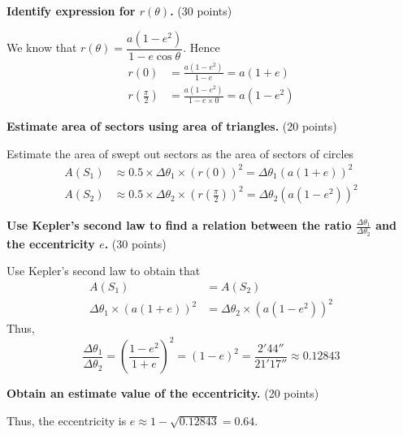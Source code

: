 \textbf{Identify expression for $r(\theta)$.} \hfill(30 points)

We know that
$r(\theta) = \dfrac{a\left(1 - e^2\right)}{1 - e\cos\theta}$. Hence %
\begin{align*}
  r(0) &= \frac{a\left(1 - e^2\right)}{1 - e} = a(1 + e) \\
  r\left(\frac{\pi}{2}\right)
    &= \frac{a\left(1 - e^2\right)}{1 - e\times0} = a\left(1 - e^2\right)
\end{align*}


\medskip
\textbf{Estimate area of sectors using area of triangles.} \hfill(20 points)

Estimate the area of swept out sectors as the area of sectors of circles
\begin{align*}
  A(S_1) &\approx 0.5\times\Delta\theta_1\times\left(r(0)\right)^2
    = \Delta\theta_1\left(a(1 + e)\right)^2 \\ %
  A(S_2) &\approx 0.5\times\Delta\theta_2
    \times\left(r\left(\tfrac{\pi}{2}\right)\right)^2
    = \Delta\theta_2\left(a(1 - e^2)\right)^2
\end{align*}

\medskip
\textbf{Use Kepler's second law to find a relation between the ratio
$\frac{\Delta\theta_1}{\Delta\theta_2}$ and the eccentricity $e$.}
\hfill(30 points)

Use Kepler's second law to obtain that
\begin{align*}
  A(S_1) &= A(S_2) \\
  \Delta\theta_1\times(a(1 + e))^2 &= \Delta\theta_2\times(a(1 - e^2))^2
\end{align*}
Thus,
\[
  \frac{\Delta\theta_1}{\Delta\theta_2}
    = \left(\frac{1 - e^2}{1 + e}\right)^2 = (1 - e)^2
    = \frac{2'44''}{21'17''} \approx 0.12843
\]

\medskip
\textbf{Obtain an estimate value of the eccentricity.} \hfill(20 points)

Thus, the eccentricity is $e \approx 1 - \sqrt{0.12843} = 0.64$.
